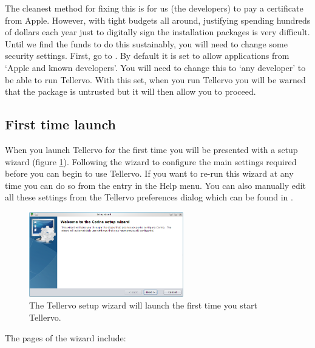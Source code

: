 The cleanest method for fixing this is for us (the developers) to pay a certificate from Apple.  However, with tight budgets all around, justifying spending hundreds of dollars each year just to digitally sign the installation packages is very difficult.  Until we find the funds to do this sustainably, you will need to change some security settings.  First, go to .  By default it is set to allow applications from `Apple and known developers'.  You will need to change this to `any developer' to be able to run Tellervo. With this set, when you run Tellervo you will be warned that the package is untrusted but it will then allow you to proceed.


\subsection{First time launch}
When you launch Tellervo for the first time you will be presented with a setup wizard (figure \ref{fig:setupwizard}).  Following the wizard to configure the main settings required before you can begin to use Tellervo.  If you want to re-run this wizard at any time you can do so from the entry in the Help menu. You can also manually edit all these settings from the Tellervo preferences dialog which can be found in .

\begin{figure}[hbtp]
  \centering
    \includegraphics[width=0.6\textwidth]{Images/setupwizard.png}
  \caption{The Tellervo setup wizard will launch the first time you start Tellervo.}
  \label{fig:setupwizard}
\end{figure}

The pages of the wizard include:

